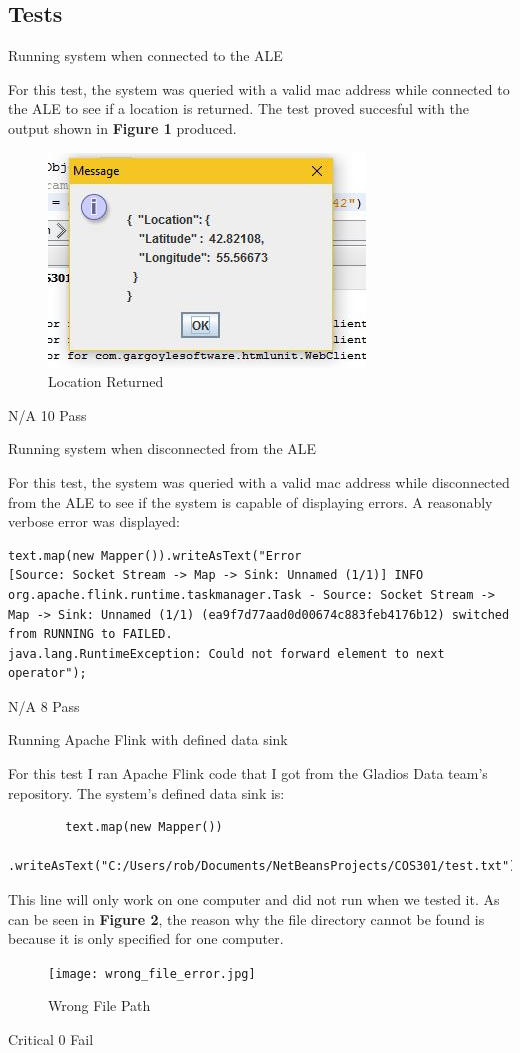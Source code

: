 \subsection{Tests}

\FuncReq
{Running system when connected to the ALE}
{For this test, the system was queried with a valid mac address while connected to the ALE to see if a location is returned. The test proved succesful with the output shown in \textbf{Figure 1} produced.
			\begin{figure}[h]
				\centering
				\includegraphics{functional/images/right_mac.jpg}
				\caption{Location Returned}
				\label{fig:LocationReturned}
			\end{figure}
}
{N/A}
{10}
{Pass}

\FuncReq
{Running system when disconnected from the ALE}
{For this test, the system was queried with a valid mac address while disconnected from the ALE to see if the system is capable of displaying errors. A reasonably verbose error was displayed: 
\begin{verbatim}
text.map(new Mapper()).writeAsText("Error
[Source: Socket Stream -> Map -> Sink: Unnamed (1/1)] INFO org.apache.flink.runtime.taskmanager.Task - Source: Socket Stream -> Map -> Sink: Unnamed (1/1) (ea9f7d77aad0d00674c883feb4176b12) switched from RUNNING to FAILED.
java.lang.RuntimeException: Could not forward element to next operator");
\end{verbatim}
}
{N/A}
{8}
{Pass}

\FuncReq
{Running Apache Flink with defined data sink}
{For this test I ran Apache Flink code that I got from the Gladios Data team's repository.
 The system's defined data sink is:
	\begin{verbatim}
		text.map(new Mapper())
		.writeAsText("C:/Users/rob/Documents/NetBeansProjects/COS301/test.txt");
	\end{verbatim}
This line will only work on one computer and did not run when we tested it. As can be seen in \textbf{Figure 2}, the reason why the file directory cannot be found is because it is only specified for one computer.
			\begin{figure}[h]
				\centering
				\texttt{[image: wrong\_file\_error.jpg]}
				\caption{Wrong File Path}
				\label{fig:WrongFIlePath}
			\end{figure} 
}
{Critical}
{0}
{Fail}
		
